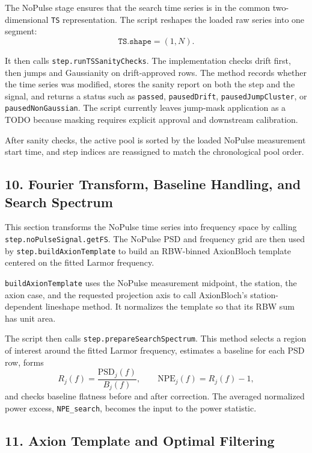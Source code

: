 \documentclass[11pt]{article}
\newcommand{\code}[1]{\texttt{#1}}
\begin{document}
The NoPulse stage ensures that the search time series is in the common
two-dimensional \code{TS} representation. The script reshapes the loaded raw
series into one segment:
\[
  \code{TS.shape} = (1, N).
\]

It then calls \code{step.runTSSanityChecks}. The implementation checks drift
first, then jumps and Gaussianity on drift-approved rows. The method records
whether the time series was modified, stores the sanity report on both the step
and the signal, and returns a status such as \code{passed},
\code{pausedDrift}, \code{pausedJumpCluster}, or \code{pausedNonGaussian}.
The script currently leaves jump-mask application as a TODO because masking
requires explicit approval and downstream calibration.

After sanity checks, the active pool is sorted by the loaded NoPulse
measurement start time, and step indices are reassigned to match the
chronological pool order.

\subsection{10. Fourier Transform, Baseline Handling, and Search Spectrum}

This section transforms the NoPulse time series into frequency space by calling
\code{step.noPulseSignal.getFS}. The NoPulse PSD and frequency grid are then
used by \code{step.buildAxionTemplate} to build an RBW-binned AxionBloch
template centered on the fitted Larmor frequency.

\code{buildAxionTemplate} uses the NoPulse measurement midpoint, the station,
the axion case, and the requested projection axis to call AxionBloch's
station-dependent lineshape method. It normalizes the template so that its RBW
sum has unit area.

The script then calls \code{step.prepareSearchSpectrum}. This method selects a
region of interest around the fitted Larmor frequency, estimates a baseline
for each PSD row, forms
\[
  R_j(f) = \frac{\mathrm{PSD}_j(f)}{B_j(f)},
  \qquad
  \mathrm{NPE}_j(f) = R_j(f)-1,
\]
and checks baseline flatness before and after correction. The averaged
normalized power excess, \code{NPE\_search}, becomes the input to the power
statistic.

\subsection{11. Axion Template and Optimal Filtering}
\end{document}

